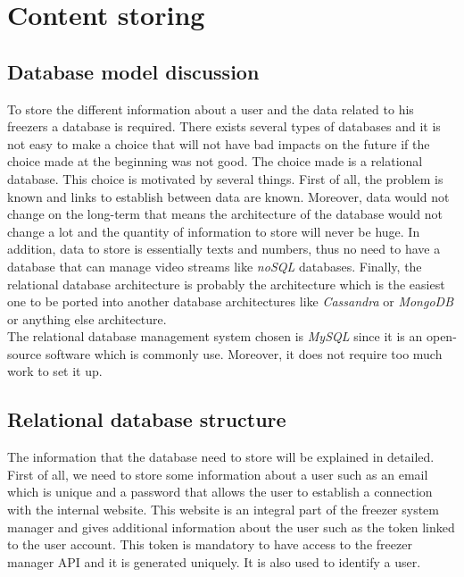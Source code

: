 \section{Content storing}
\subsection{Database model discussion}
To store the different information about a user and the data related to his freezers a database is required. There exists several types of databases and it is not easy to make a choice that will not have bad impacts on the future if the choice made at the beginning was not good. The choice made is a relational database. This choice is motivated by several things. First of all, the problem is known and links to establish between data are known. Moreover, data would not change on the long-term that means the architecture of the database would not change a lot and the quantity of information to store will never be huge. In addition, data to store is essentially texts and numbers, thus no need to have a database that can manage video streams like \textit{noSQL} databases. Finally, the relational database architecture is probably the architecture which is the easiest one to be ported into another database architectures like \textit{Cassandra} or \textit{MongoDB} or anything else architecture.\\

The relational database management system chosen is \textit{MySQL} since it is an open-source software which is commonly use. Moreover, it does not require too much work to set it up.

\subsection{Relational database structure}
The information that the database need to store will be explained in detailed.\\

First of all, we need to store some information about a user such as an email which is unique and a password that allows the user to establish a connection with the internal website. This website is an integral part of the freezer system manager and gives additional information about the user such as the token linked to the user account. This token is mandatory to have access to the freezer manager API and it is generated uniquely. It is also used to identify a user. \\

